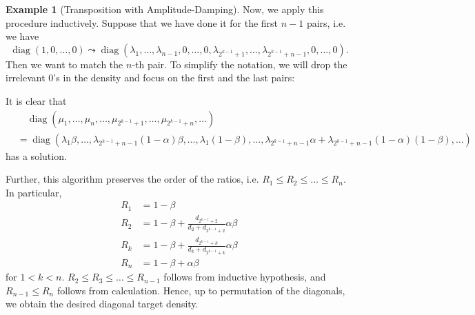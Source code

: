 \documentclass[11pt,reqno]{amsart}
\theoremstyle{definition}
\newtheorem{example}[theorem]{Example}
\DeclareMathOperator{\diag}{diag}
\begin{document}
\begin{example}[Transposition with Amplitude-Damping]
    Now, we apply this procedure inductively. Suppose that we have done it for the first $n-1$ pairs, i.e. 
    we have $$\diag(1, 0,\dots, 0)\leadsto \diag(\lambda_1, \dots, \lambda_{n-1}, 0,\dots, 0, \lambda_{2^{k-1}+1}, \dots, \lambda_{2^{k-1}+n-1}, 0, \dots, 0).$$
    Then we want to match the $n$-th pair. To simplify the notation, we will drop the irrelevant $0$'s in the density and focus on the first and the last pairs:
    \begin{center}
    \end{center}
    It is clear that 
    \begin{equation*}
    \begin{aligned}
        &\quad\diag(\mu_1, \dots, \mu_n, \dots, \mu_{2^{k-1}+1}, \dots, \mu_{2^{k-1}+n}, \dots)\\
        &= \diag(\lambda_1\beta, \dots, \lambda_{2^{k-1}+n-1}(1-\alpha)\beta, \dots, \lambda_1(1-\beta), \dots, \lambda_{2^{k-1}+n-1}\alpha+\lambda_{2^{k-1}+n-1}(1-\alpha)(1-\beta), \dots)
    \end{aligned}
    \end{equation*}
    has a solution.

    Further, this algorithm preserves the order of the ratios, i.e. $R_1\leq R_2\leq\dots\leq R_n$.
    In particular, 
    \begin{equation*}
    \begin{aligned}
        R_1 &= 1-\beta\\
        R_2 &= 1-\beta+\frac{d_{2^{k-1}+2}}{d_2+d_{2^{k-1}+2}}\alpha\beta\\
        R_k &= 1-\beta+\frac{d_{2^{k-1}+k}}{d_k+d_{2^{k-1}+k}}\alpha\beta\\
        R_n &= 1-\beta+\alpha\beta
    \end{aligned}
    \end{equation*}
    for $1<k<n$. $R_2\leq R_3\leq\dots\leq R_{n-1}$ follows from inductive hypothesis, and $R_{n-1}\leq R_n$ follows from calculation.
    Hence, up to permutation of the diagonals, we obtain the desired diagonal target density.
    

\end{example}
\end{document}
